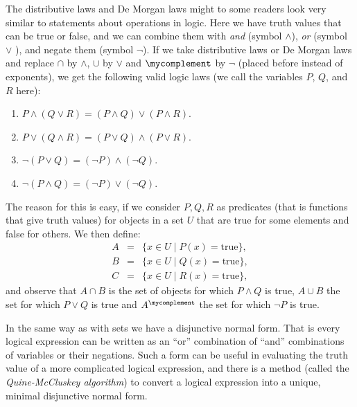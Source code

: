 The distributive laws and De Morgan laws might to some readers look very
similar to statements about operations in logic. Here we have truth values
that can be true or false, and we can combine them with {\em and} (symbol
$\wedge$),
{\em or} (symbol $\vee$
),
and negate them (symbol $\lnot$). If we take distributive laws or De Morgan
laws and replace $\cap$ by $\wedge$, $\cup$ by $\vee$ and $\mycomplement$ by
$\lnot$ (placed before instead of exponents), we get the following valid
logic laws (we call the variables $P$, $Q$, and $R$ here):
\begin{enumerate}
\item $P\wedge (Q\vee R)=(P\wedge Q)\vee(P\wedge R)$. 
\item $P\vee (Q\wedge R)=(P\vee Q)\wedge(P\vee R)$. 
\item $\lnot(P\vee Q)=(\lnot P)\wedge (\lnot Q)$.
\item $\lnot(P\wedge Q)=(\lnot P)\vee (\lnot Q)$.
\end{enumerate}
The reason for this is easy, if we consider $P,Q,R$ as predicates (that is
functions that give truth values) for
objects in a set $U$ that are true for some elements and false for others.
We then define:
\begin{eqnarray*}
A&=&\{x\in U\mid P(x)=\mbox{true}\},\\
B&=&\{x\in U\mid Q(x)=\mbox{true}\},\\
C&=&\{x\in U\mid R(x)=\mbox{true}\},
\end{eqnarray*}
and observe that $A\cap B$ is the set of objects for which $P\wedge Q$ is
true, $A\cup B$ the set for which $P\vee Q$ is true and $A^\mycomplement$ the
set for which $\lnot P$ is true.
\medskip

In the same way as with sets we have a disjunctive normal form. That is
every logical expression can be written as an ``or'' combination of ``and''
combinations of variables or their negations.
Such a form can be useful in evaluating the truth value of a more
complicated logical expression, and there is a method (called the
{\em Quine-McCluskey algorithm}) to convert a logical expression into a
unique, minimal disjunctive normal form.

